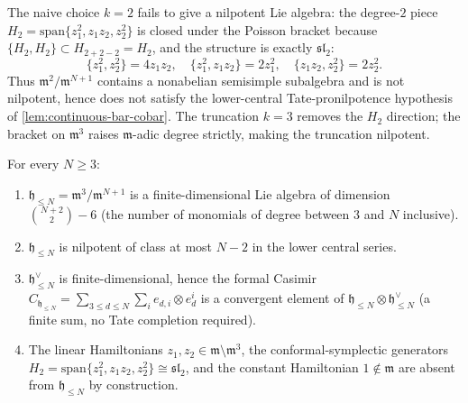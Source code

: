 \begin{rmk}
The naive choice $k=2$ fails to give a nilpotent Lie algebra: the
degree-$2$ piece $H_2=\mathrm{span}\{z_1^2,z_1z_2,z_2^2\}$ is closed
under the Poisson bracket because $\{H_2,H_2\}\subset H_{2+2-2}=H_2$,
and the structure is exactly $\mathfrak{sl}_2$:
$$\{z_1^2,z_2^2\}=4z_1z_2,\quad
  \{z_1^2,z_1z_2\}=2z_1^2,\quad
  \{z_1z_2,z_2^2\}=2z_2^2.$$
Thus $\mathfrak m^2/\mathfrak m^{N+1}$ contains a nonabelian
semisimple subalgebra and is not nilpotent, hence does not satisfy
the lower-central Tate-pronilpotence hypothesis of
\ref{lem:continuous-bar-cobar}. The truncation $k=3$ removes the
$H_2$ direction; the bracket on $\mathfrak m^3$ raises
$\mathfrak m$-adic degree strictly, making the truncation
nilpotent.
\end{rmk}

\begin{lem}
\label{lem:trunc-is-nilpotent-lie}
For every $N\geq 3$:
\begin{enumerate}
  \item $\mathfrak h_{\leq N}=\mathfrak m^3/\mathfrak m^{N+1}$ is a
    finite-dimensional Lie algebra of dimension
    $\binom{N+2}{2}-6$ (the number of
    monomials of degree between $3$ and $N$ inclusive).
  \item $\mathfrak h_{\leq N}$ is nilpotent of class at most
    $N-2$ in the lower central series.
  \item $\mathfrak h_{\leq N}^\vee$ is finite-dimensional, hence the
    formal Casimir
    $C_{\mathfrak h_{\leq N}}=\sum_{3\leq d\leq N}\sum_i
     e_{d,i}\otimes e_d^i$
    is a convergent element of
    $\mathfrak h_{\leq N}\otimes\mathfrak h_{\leq N}^\vee$ (a finite
    sum, no Tate completion required).
  \item The linear Hamiltonians $z_1,z_2\in\mathfrak m\setminus
    \mathfrak m^3$, the conformal-symplectic generators
    $H_2=\mathrm{span}\{z_1^2,z_1z_2,z_2^2\}\cong\mathfrak{sl}_2$,
    and the constant Hamiltonian $1\notin\mathfrak m$ are absent
    from $\mathfrak h_{\leq N}$ by construction.
\end{enumerate}
\end{lem}

